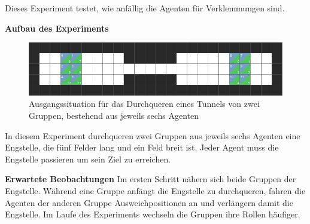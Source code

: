 Dieses Experiment testet, wie anfällig die Agenten für Verklemmungen sind.

\textbf{Aufbau des Experiments}
\begin{figure}[H]
    \includegraphics[width=\textwidth]{images/tunnel_2_groups.png}
    \centering
    \caption{Ausgangssituation für das Durchqueren eines Tunnels von zwei Gruppen, bestehend aus jeweils sechs Agenten}
    \label{fig:tunnel}
\end{figure}
In diesem Experiment durchqueren zwei Gruppen aus jeweils sechs Agenten eine Engstelle, die fünf Felder lang und ein Feld breit ist. Jeder Agent muss die Engstelle passieren um sein Ziel zu erreichen.

\textbf{Erwartete Beobachtungen}\newline
Im ersten Schritt nähern sich beide Gruppen der Engstelle. Während eine Gruppe anfängt die Engstelle zu durchqueren, fahren die Agenten der anderen Gruppe Ausweichpositionen an und verlängern damit die Engstelle. Im Laufe des Experiments wechseln die Gruppen ihre Rollen häufiger.
